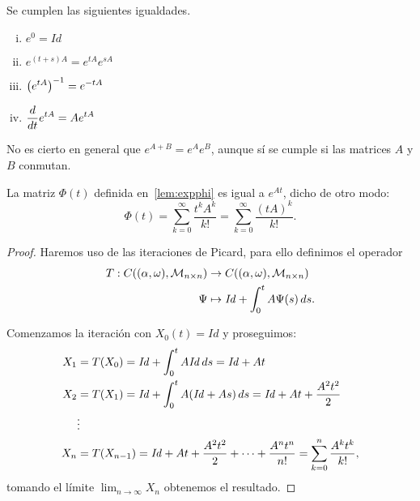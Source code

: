 \documentclass[../ecuaciones_diferenciales.tex]{subfiles}
\begin{document}
\begin{proposition}
	Se cumplen las siguientes igualdades.
	\begin{multicols}{2}
		\begin{enumerate}[i)]
			\item \(\displaystyle e^0 = \mathit{Id}\)

			\item \(\displaystyle e^{(t + s)A} = e^{tA} e^{sA}\)

			\item \(\displaystyle \parens{e^{tA}}^{-1} = e^{-tA}\)

			\item \(\displaystyle \frac{d}{\mathop{d\!} t} e^{tA} = A e^{tA}\)
		\end{enumerate}
	\end{multicols}
\end{proposition}

\begin{remark}
	No es cierto en general que \(e^{A + B} = e^A e^B\), aunque sí se cumple si
    las matrices \(A\) y \(B\) conmutan.
\end{remark}

\begin{theorem}
	La matriz \(\Phi(t)\) definida en~\ref{lem:expphi} es igual a \(e^{At}\),
	dicho de otro modo:
	\[\Phi(t) = \sum_{k = 0}^\infty \frac{t^k A^k}{k!} =
		\sum_{k = 0}^\infty \frac{(tA)^k}{k!}.\]
\end{theorem}

\begin{proof}
	Haremos uso de las iteraciones de Picard, para ello definimos el operador
	\begin{align*}
		T : C((\alpha, \omega), \mathcal{M}_{n \times n}) 
		& \to C((\alpha, \omega), \mathcal{M}_{n \times n}) \\
		\Psi & \mapsto \mathit{Id} + \int_0^t A \Psi(s) \mathop{d\!} s.
	\end{align*}

	Comenzamos la iteración con \(X_0(t) = \mathit{Id}\) y proseguimos:
	\begin{align*}
		X_1 & = T(X_0) = \mathit{Id} + \int_0^t A \mathit{Id} \mathop{d\!} s =
		\mathit{Id} + At                                                      \\
		X_2 & = T(X_1) = \mathit{Id} + \int_0^t A (\mathit{Id} + As) \mathop{d\!} s =
		\mathit{Id} + At + \frac{A^2 t^2}{2}                                  \\
		    & \vdots                                                          \\
		X_n & = T(X_{n - 1}) =
		\mathit{Id} + At + \frac{A^2 t^2}{2} + \cdots + \frac{A^n t^n}{n!}
		= \sum_{k = 0}^n \frac{A^k t^k}{k!},
	\end{align*}
	tomando el límite \(\lim_{n \to \infty} X_n\) obtenemos el resultado.
\end{proof}
\end{document}
